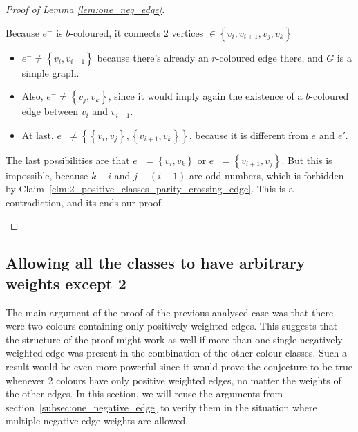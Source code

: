 \begin{proof}[Proof of Lemma \ref{lem:one_neg_edge}]
\begin{enumerate}
\begin{enumerate}
                Because $e^-$ is $b$-coloured, it connects $2$ vertices $\in \left\{ v_i, v_{i+1}, v_j, v_k \right\}$
                \begin{itemize}
                    \item $e^- \neq \left\{ v_i, v_{i+1} \right\}$ because there's already an $r$-coloured edge there, and $G$ is a simple graph.
                    \item Also, $e^- \neq \left\{ v_j, v_k \right\}$, since it would imply again the existence of a $b$-coloured edge between $v_i$ and $v_{i+1}$.
                    \item At last, $e^- \neq \left\{ \left\{v_i, v_j\right\}, \left\{v_{i+1}, v_k\right\} \right\}$, because it is different from $e$ and $e'$.
                \end{itemize}

                The last possibilities are that $e^- = \left\{ v_i, v_k \right\}$ or $e^- = \left\{ v_{i+1}, v_j \right\}$.
                But this is impossible, because $k - i$ and $j - (i+1)$ are odd numbers, which is forbidden by Claim~\ref{clm:2_positive_classes_parity_crossing_edge}.
                This is a contradiction, and its ends our proof.
        \end{enumerate}
    \end{enumerate}
\end{proof}


\subsection{Allowing all the classes to have arbitrary weights except 2}
\label{subsec:2-pos-classes}

The main argument of the proof of the previous analysed case was that there were two colours containing only positively weighted edges.
This suggests that the structure of the proof might work as well if more than one single negatively weighted edge was present in the combination of the other colour classes.
Such a result would be even more powerful since it would prove the conjecture to be true whenever 2 colours have only positive weighted edges, no matter the weights of the other edges.
In this section, we will reuse the arguments from section~\ref{subsec:one_negative_edge} to verify them in the situation where multiple negative edge-weights are allowed.


